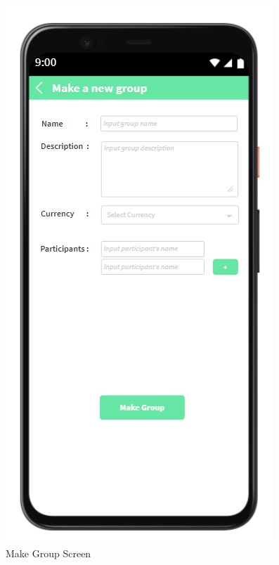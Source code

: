 \documentclass[conference]{IEEEtran}
\begin{document}
\begin{enumerate}
\begin{figure}[H]
                \centerline{\includegraphics[scale=0.5]{img/ui/group-make.jpg}}
                \caption{Make Group Screen}
                \label{fig:make-group-screen}
            \end{figure}
            \begin{figure}[H]

\end{figure}
\end{enumerate}
\end{document}
